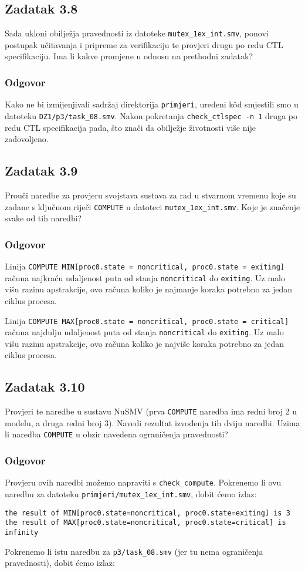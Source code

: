 \documentclass{article}
\newcommand{\zadatak}[1]{\subsection{Zadatak #1}}
\newcommand{\odgovor}{\subsubsection*{Odgovor}}
\newcommand{\code}[1]{\colorbox{blue!11}{\texttt{#1}}}
\begin{document}
\zadatak{3.8}

Sada ukloni obilježja pravednosti iz datoteke \code{mutex\_1ex\_int.smv}, ponovi postupak učitavanja i pripreme za verifikaciju te provjeri drugu po redu CTL specifikaciju. Ima li kakve promjene u odnosu na prethodni zadatak?

\odgovor

Kako ne bi izmijenjivali sadržaj direktorija \code{primjeri}, uređeni kôd smjestili smo u datoteku \code{DZ1/p3/task\_08.smv}. Nakon pokretanja \code{check\_ctlspec -n 1} druga po redu CTL specifikacija pada, što znači da obilježje životnosti više nije zadovoljeno.


\zadatak{3.9}

Prouči naredbe za provjeru svojstava sustava za rad u stvarnom vremenu koje su zadane s ključnom riječi \code{COMPUTE} u datoteci \code{mutex\_1ex\_int.smv}. Koje je značenje svake od tih naredbi?

\odgovor

Linija \code{COMPUTE MIN[proc0.state = noncritical, proc0.state = exiting]} računa najkraću udaljenost puta od stanja \code{noncritical} do \code{exiting}. Uz malo višu razinu apstrakcije, ovo računa koliko je najmanje koraka potrebno za jedan ciklus procesa.
\newline

\noindent
Linija \code{COMPUTE MAX[proc0.state = noncritical, proc0.state = critical]} računa najdulju udaljenost puta od stanja \code{noncritical} do \code{exiting}. Uz malo višu razinu apstrakcije, ovo računa koliko je najviše koraka potrebno za jedan ciklus procesa.


\zadatak{3.10}

Provjeri te naredbe u sustavu NuSMV (prva \code{COMPUTE} naredba ima redni broj 2 u modelu, a druga redni broj 3). Navedi rezultat izvođenja tih dviju naredbi. Uzima li naredba \code{COMPUTE} u obzir navedena ograničenja pravednosti?

\odgovor

Provjeru ovih naredbi možemo napraviti s \code{check\_compute}. Pokrenemo li ovu naredbu za datoteku \code{primjeri/mutex\_1ex\_int.smv}, dobit ćemo izlaz:

\begin{verbatim}
the result of MIN[proc0.state=noncritical, proc0.state=exiting] is 3
the result of MAX[proc0.state=noncritical, proc0.state=critical] is infinity
\end{verbatim}

\noindent
Pokrenemo li istu naredbu za \code{p3/task\_08.smv} (jer tu nema ograničenja pravednosti), dobit ćemo izlaz:
\end{document}

